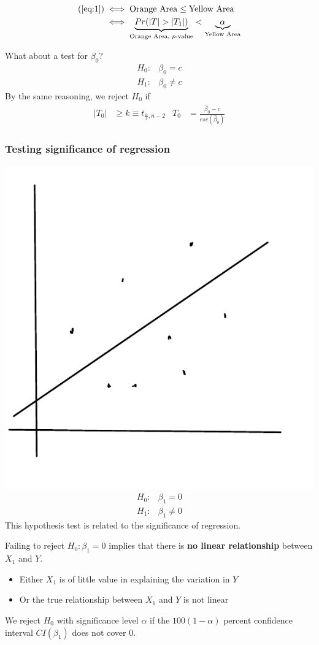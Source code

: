 \documentclass[12 pt]{article}
\begin{document}
    \begin{align*}
      (\ref{eq:1}) & \iff \text{Orange Area} \leq \text{Yellow Area}
      \\ & \iff \underbrace{Pr(|T| > |T_1|)}_{\text{Orange Area,
           $p$-value}} < \underbrace{\alpha}_{\text{Yellow Area}}
    \end{align*}

    What about a test for $\beta_0$?
    \begin{align*}
      H_0: & \beta_0 = c
      \\ H_1: & \beta_0 \neq c
    \end{align*}
    By the same reasoning, we reject $H_0$ if
    \begin{align*}
      |T_0| & \geq k \equiv t_{\frac{\alpha}{2}, n-2} & T_0 & = \frac{\hat{\beta}_0- c}{ese(\hat{\beta}_0)}
    \end{align*}
    \subsubsection{Testing significance of regression}
    \includegraphics[width=.6\textwidth]{17.pdf}
    \begin{align*}
      H_0: & \beta_1 = 0
      \\ H_1: & \beta_1 \neq 0
    \end{align*}
    This hypothesis test is related to the significance of regression.

    Failing to reject $H_0: \beta_1 = 0$ implies that there is
    \textbf{no linear relationship} between $X_1$ and $Y$.
    \begin{itemize}
    \item Either $X_1$ is of little value in explaining the variation
      in $Y$
    \item Or the true relationship between $X_1$ and $Y$ is not linear
    \end{itemize}
    We reject $H_0$ with significance level $\alpha$ if the
    $100(1-\alpha)$ percent confidence interval $CI(\beta_1)$ does
    not cover $0$.
\end{document}
